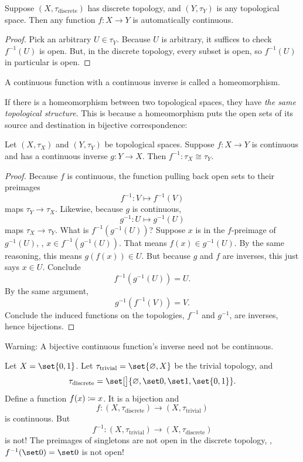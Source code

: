 \documentclass[a5paper]{scrbook}
\begin{document}
  \begin{theorem}
    Suppose \((X,\tau_{\text{discrete}})\) has discrete topology, and \((Y,\tau_Y)\) is any topological space. Then any function \(f:X\to Y\) is automatically continuous. 
  \end{theorem}
  \begin{proof}
    Pick an arbitrary \(U\in\tau_Y\). Because \(U\) is arbitrary, it suffices to check \(f^{-1}(U)\) is open. But, in the discrete topology, every subset is open, so \(f^{-1}(U)\) in particular is open. 
  \end{proof}
  \begin{defn}[Homeomorphism]
    A continuous function with a continuous inverse is called a homeomorphism. 
  \end{defn}
  If there is a homeomorphism between two topological spaces, they have \emph{the same topological structure}. This is because a homeomorphism puts the open sets of its source and destination in bijective correspondence:
  \begin{theorem}
    Let \((X,\tau_X)\) and \((Y,\tau_Y)\) be topological spaces. Suppose \(f:X \to Y\) is continuous and has a continuous inverse \(g:Y\to X\). Then \(f^{-1}:\tau_X\cong \tau_Y\). 
  \end{theorem}
  \begin{proof}
    Because \(f\) is continuous, the function pulling back open sets to their preimages
    \[
      f^{-1}:V \mapsto f^{-1}(V) 
    \]
    maps \(\tau_Y\to\tau_X\). Likewise, because \(g\) is continuous,
    \[
      g^{-1}:U \mapsto g^{-1}(U) 
    \]
    maps \(\tau_X\to \tau_Y\). What is \(f^{-1}(g^{-1}(U))\)?  Suppose \(x\) is in the \(f\)-preimage of \(g^{-1}(U)\), \ie, \(x\in f^{-1}(g^{-1}(U))\). That means \(f(x)\in g^{-1}(U)\). By the same reasoning, this means \(g(f(x))\in U\). But because \(g\) and \(f\) are inverses, this just says \(x\in U\). Conclude
    \[
      f^{-1}(g^{-1}(U)) =U. 
    \]
    By the same argument,
    \[
      g^{-1}(f^{-1}(V)) = V. 
    \]
    Conclude the induced functions on the topologies, \(f^{-1}\) and \(g^{-1}\), are inverses, hence bijections.  
  \end{proof}
  Warning: A bijective continuous function's inverse need not be continuous.
  \begin{counterex}
    Let \(X=\set{0,1}\). Let \(\tau_{\text{trivial}}=\set{\emptyset, X}\) be the trivial topology, and
    \[
      \tau_{\text{discrete}}=\set[\big]{\emptyset, \set 0, \set 1, \set{0,1}}. 
    \]
    Define a function \(f(x)\coloneqq x\). It is a bijection and
    \[
      f:(X,\tau_{\text{discrete}}) \to (X,\tau_{\text{trivial}})
    \]
    is continuous. But
    \[
      f^{-1}: (X,\tau_{\text{trivial}})\to(X,\tau_{\text{discrete}}) 
    \]
    is not! The preimages of singletons are not open in the discrete topology, \eg, \(f^{-1}(\set 0 )=\set 0\) is not open!
  \end{counterex}
\end{document}
